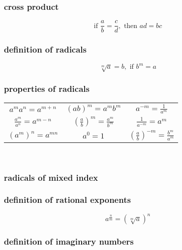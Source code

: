 \documentclass[a4paper,12pt]{article}
\begin{document}
\subsubsection{cross product}

\[ \text{if } \frac{a}{b} = \frac{c}{d}, \text{ then } ad = bc \]

\subsubsection{definition of radicals}

\[ \sqrt[m]{a} = b, \text{ if } b^{m} = a \]

\subsubsection{properties of radicals}

\begin{center}
    \begin{tabular}{*{3}c}
        \( a^{m} a^{n} = a^{m+n} \) & \(  (ab)^{m} = a^{m} b^{m} \) & \( a^{-m}
        = \displaystyle{\frac{1}{a^{m}}} \) \\[10pt]
        \( \displaystyle{\frac{a^{m}}{a^{n}} }= a^{m-n} \) & \( \displaystyle{
            \left(\frac{a}{b}\right)^{m} } =
            \frac{a^{m}}{b^{m}} \) & \( \displaystyle{\frac{1}{a^{-m}}} = a^{m} \) \\[10pt]
        \( \left(a^{m}\right)^{n} = a^{mn} \) & \( a^{0} = 1 \) & \(  
        \left( \displaystyle{\frac{a}{b}}\right)^{-m} =
        \displaystyle{\frac{b^{m}}{a^{m}}} \)
    \end{tabular}\\[1cm]
\end{center}
\begin{center}
\end{center}

\subsubsection{radicals of mixed index}

\subsubsection{definition of rational exponents}

\[ a^{\frac{n}{m}}=\left(\sqrt[m]{a}\right)^{n} \]

\subsubsection{definition of imaginary numbers}
\end{document}
